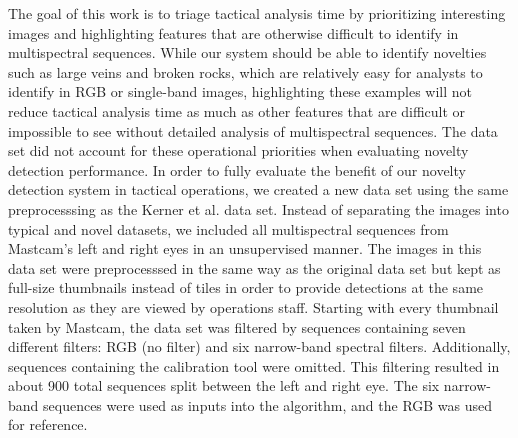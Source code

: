 The goal of this work is to triage tactical analysis time by prioritizing interesting images and highlighting features that are otherwise difficult to identify in multispectral sequences.
While our system should be able to identify novelties such as large veins and broken rocks, which are relatively easy for analysts to identify in RGB or single-band images, highlighting these examples will not reduce tactical analysis time as much as other features that are difficult or impossible to see without detailed analysis of multispectral sequences. 
The \cite{kerner2020comparison} data set did not account for these operational priorities when evaluating novelty detection performance. 
In order to fully evaluate the benefit of our novelty detection system in tactical operations, we created a new data set using the same preprocesssing as the Kerner et al. data set. 
Instead of separating the images into typical and novel datasets, we included all multispectral sequences from Mastcam's left and right eyes in an unsupervised manner.
The images in this data set were preprocesssed in the same way as the original data set but kept as full-size thumbnails instead of tiles in order to provide detections at the same resolution as they are viewed by operations staff. 
Starting with every thumbnail taken by Mastcam, the data set was filtered by sequences containing seven different filters: RGB (no filter) and six narrow-band spectral filters.
Additionally, sequences containing the calibration tool were omitted. 
This filtering resulted in about 900 total sequences split between the left and right eye. 
The six narrow-band sequences were used as inputs into the algorithm, and the RGB was used for reference.
